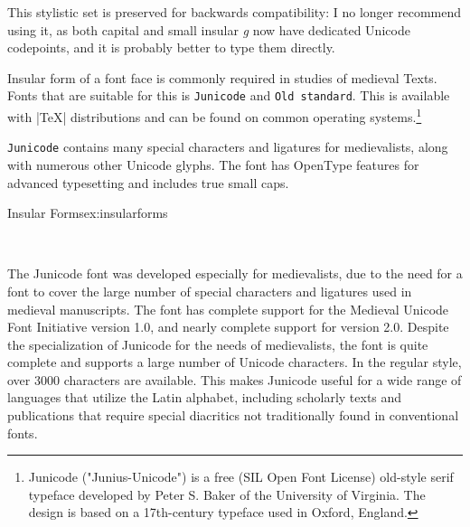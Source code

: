 \begin{description}
\begin{center}
\begin{tabular}[c]{ccc}
\end{tabular}
\end{center}

This stylistic set is preserved for backwards compatibility: I no longer 
recommend using it, as both capital and small insular \textit{g} now 
have dedicated Unicode codepoints, and it is probably better to type them
directly.

\end{description}


Insular form of a font face is commonly required in studies
of medieval Texts. Fonts that are suitable for this is \texttt{Junicode} and \texttt{Old standard}. This is available with |TeX| distributions and can be found on common operating systems.\footnote{Junicode ("Junius-Unicode") is a free (SIL Open Font License) old-style serif typeface developed by Peter S. Baker of the University of Virginia. The design is based on a 17th-century typeface used in Oxford, England.}

\texttt{Junicode} contains many special characters and ligatures for medievalists, along with numerous other Unicode glyphs. The font has OpenType features for advanced typesetting and includes true small caps.

\begin{texexample}{Insular Forms}{ex:insularforms}
\bgroup
\huge
{}
\fox \\
\egroup

\bgroup
\huge
{}
\fox \\
\egroup
\end{texexample}

The Junicode font was developed especially for medievalists, due to the need for a font to cover the large number of special characters and ligatures used in medieval manuscripts. The font has complete support for the Medieval Unicode Font Initiative version 1.0, and nearly complete support for version 2.0.
Despite the specialization of Junicode for the needs of medievalists, the font is quite complete and supports a large number of Unicode characters. In the regular style, over 3000 characters are available. This makes Junicode useful for a wide range of languages that utilize the Latin alphabet, including scholarly texts and publications that require special diacritics not traditionally found in conventional fonts.

